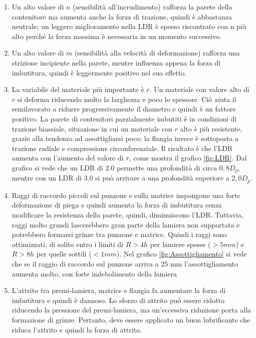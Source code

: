 \begin{enumerate}
\item Un alto valore di $n$ (sensibilità all'incrudimento) rafforza la parete della contenitore ma aumenta anche la forza di trazione, quindi è abbastanza neutrale; un leggero miglioramento nella \ac{LDR} è spesso riscontrato con n più alto perché la forza massima è necessaria in un momento successivo.
\item Un alto valore di $m$ (sensibilità alla velocità di deformazione) rafforza una strizione incipiente nella parete, mentre influenza appena la forza di imbutitura, quindi è leggermente positivo nel suo effetto.
\item La variabile del materiale più importante è $r$. Un materiale con valore alto di $r$ si deforma 
riducendo molto la larghezza e poco lo spessore.
Ciò aiuta il semilavorato a ridurre progressivamente il diametro e quindi è un fattore positivo. 
La parete di contenitori parzialmente imbutiti è in condizioni di trazione biassiale, situazione in cui un materiale con $r$ alto è più resistente, grazie alla tendenza ad assottigliarsi poco; la flangia invece è sottoposta a trazione radiale e compressione circonferenziale. Il risultato è che l'\ac{LDR} aumenta con l'aumento del valore di $\bar{r}$, come mostra il grafico \ref{fig:LDR}.
Dal grafico si vede che un \ac{LDR} di $2.0$ permette una profondità di circa $0,8 D_p$, mentre con un \ac{LDR} di $3.0$ si può arrivare a una profondità superiore a $2,0 D_p$.
\item Raggi di raccordo piccoli sul punzone e sulla matrice impongono una forte deformazione 
di piega e quindi aumenta la forza di imbutitura senza modificare la resistenza della parete, 
quindi, diminuiscono l'\ac{LDR}. Tuttavia, raggi molto grandi lascerebbero gran parte della lamiera non supportata e potrebbero formarsi grinze tra punzone e matrice.
Quindi i raggi sono ottimizzati, di solito entro i limiti di $R > 4h$ per lamiere spesse ($> 5 mm$) e 
$R > 8h$ per quelle sottili ($<1 mm$).
Nel grafico \ref{fig:Assottigliamento} si vede che se il raggio di raccordo sul punzone arriva a 25 mm l'assottigliamento aumenta molto, con forte indebolimento della lamiera
\item L'attrito tra premi-lamiera, matrice e flangia fa aumentare la forza di imbutitura e quindi è 
dannoso. Lo sforzo di attrito può essere ridotto riducendo la pressione del premi-lamiera, ma 
un'eccessiva riduzione porta alla formazione di grinze. Pertanto, deve essere applicato un 
buon lubrificante che riduca l'attrito e quindi la forza di attrito.

\end{enumerate}
